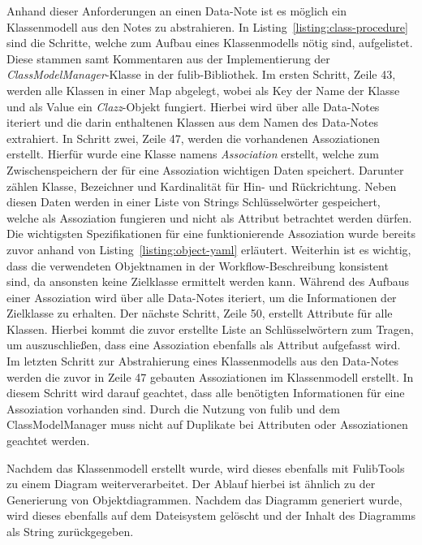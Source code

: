 Anhand dieser Anforderungen an einen Data-Note ist es möglich ein Klassenmodell aus den Notes zu abstrahieren.
In Listing~\ref{listing:class-procedure} sind die Schritte, welche zum Aufbau eines Klassenmodells nötig sind, aufgelistet.
Diese stammen samt Kommentaren aus der Implementierung der \textit{ClassModelManager}-Klasse in der fulib-Bibliothek.
Im ersten Schritt, Zeile 43, werden alle Klassen in einer Map abgelegt, wobei als Key der Name der Klasse und als Value ein \textit{Clazz}-Objekt fungiert.
Hierbei wird über alle Data-Notes iteriert und die darin enthaltenen Klassen aus dem Namen des Data-Notes extrahiert.
In Schritt zwei, Zeile 47, werden die vorhandenen Assoziationen erstellt.
Hierfür wurde eine Klasse namens \textit{Association} erstellt, welche zum Zwischenspeichern der für eine Assoziation wichtigen Daten speichert.
Darunter zählen Klasse, Bezeichner und Kardinalität für Hin- und Rückrichtung.
Neben diesen Daten werden in einer Liste von Strings Schlüsselwörter gespeichert, welche als Assoziation fungieren und nicht als Attribut betrachtet werden dürfen.
Die wichtigsten Spezifikationen für eine funktionierende Assoziation wurde bereits zuvor anhand von Listing~\ref{listing:object-yaml} erläutert.
Weiterhin ist es wichtig, dass die verwendeten Objektnamen in der Workflow-Beschreibung konsistent sind, da ansonsten keine Zielklasse ermittelt werden kann.
Während des Aufbaus einer Assoziation wird über alle Data-Notes iteriert, um die Informationen der Zielklasse zu erhalten.
Der nächste Schritt, Zeile 50, erstellt Attribute für alle Klassen.
Hierbei kommt die zuvor erstellte Liste an Schlüsselwörtern zum Tragen, um auszuschließen, dass eine Assoziation ebenfalls als Attribut aufgefasst wird.
Im letzten Schritt zur Abstrahierung eines Klassenmodells aus den Data-Notes werden die zuvor in Zeile 47 gebauten Assoziationen im Klassenmodell erstellt.
In diesem Schritt wird darauf geachtet, dass alle benötigten Informationen für eine Assoziation vorhanden sind.
Durch die Nutzung von fulib und dem ClassModelManager muss nicht auf Duplikate bei Attributen oder Assoziationen geachtet werden.

Nachdem das Klassenmodell erstellt wurde, wird dieses ebenfalls mit FulibTools zu einem Diagram weiterverarbeitet.
Der Ablauf hierbei ist ähnlich zu der Generierung von Objektdiagrammen.
Nachdem das Diagramm generiert wurde, wird dieses ebenfalls auf dem Dateisystem gelöscht und der Inhalt des Diagramms als String zurückgegeben.

